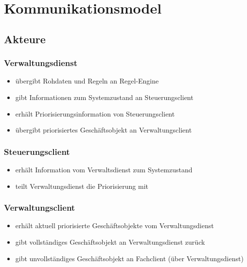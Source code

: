 \chapter{Kommunikationsmodel}

\section{Akteure}

\subsection*{Verwaltungsdienst}
\begin{itemize}
\item übergibt Rohdaten und Regeln an Regel-Engine
\item gibt Informationen zum Systemzustand an Steuerungsclient
\item erhält Priorisierungsinformation von Steuerungsclient
\item übergibt priorisiertes Geschäftsobjekt an Verwaltungsclient
\end{itemize}

\subsection*{Steuerungsclient}
\begin{itemize}
\item erhält Information vom Verwaltsdienst zum Systemzustand %
\item teilt Verwaltungsdienst die Priorisierung mit%
\end{itemize}

\subsection*{Verwaltungsclient}
\begin{itemize}
\item erhält aktuell priorisierte Geschäftsobjekte vom Verwaltungsdienst
\item gibt vollständiges Geschäftsobjekt an Verwaltungsdienst zurück
\item gibt unvollständiges Geschäftsobjekt an Fachclient (über Verwaltungsdienst)
\end{itemize}


